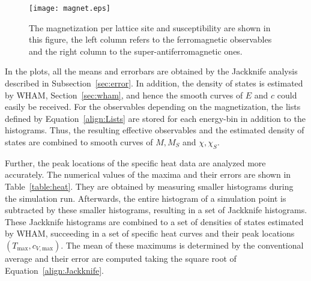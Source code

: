 \begin{figure}[!h]
  \texttt{[image: magnet.eps]}
  \caption{The magnetization per lattice site and susceptibility are shown in this figure, the left column refers to the 
           ferromagnetic observables and the right column to the super-antiferromagnetic ones.}
  \label{fig:magnet}
\end{figure}

In the plots, all the means and errorbars are obtained by the Jackknife analysis described in Subsection~\ref{sec:error}. In addition,
the density of states is estimated by WHAM, Section~\ref{sec:wham}, and hence the smooth curves of $E$ and $c$ could easily be received. For the observables 
depending on the magnetization, the lists defined by Equation~\eqref{align:Lists} are stored for each energy-bin in addition to the histograms. 
Thus, the resulting effective observables and the estimated density of states are combined to smooth curves of $M,M_S$ and $\chi,\chi_S$. 

Further, the peak locations of the specific heat data are analyzed more accurately. The numerical values of the maxima and their errors are shown 
in Table~\ref{table:heat}. They are obtained by measuring smaller histograms during the simulation run. Afterwards, the entire histogram of a simulation point 
is subtracted by these smaller histograms, resulting in a set of Jackknife histograms. These Jackknife histograms are combined to a set of densities
of states estimated by WHAM, succeeding in a set of specific heat curves and their peak locations $(T_\mathrm{max},c_{V,\mathrm{max}})$. The mean of
these maximums is determined by the conventional average and their error are computed taking the square root of Equation~\eqref{align:Jackknife}.

